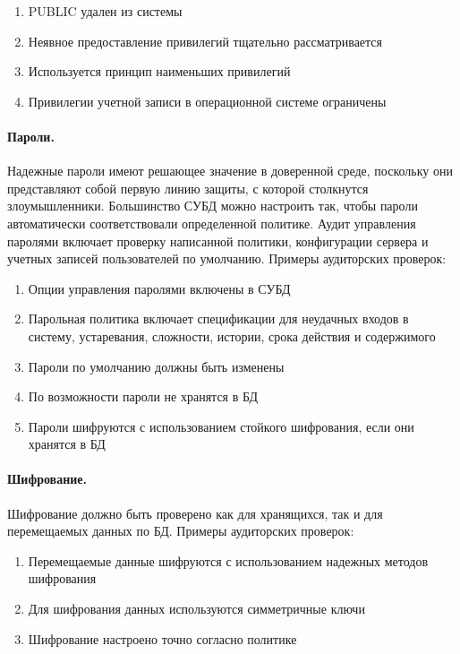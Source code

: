 \begin{enumerate}
	\item PUBLIC удален из системы
	\item Неявное предоставление привилегий тщательно рассматривается
	\item Используется принцип наименьших привилегий
	\item Привилегии учетной записи в операционной системе ограничены
\end{enumerate}

\paragraph{Пароли.}

Надежные пароли имеют решающее значение в доверенной среде, поскольку они представляют собой первую линию защиты, с которой столкнутся злоумышленники. Большинство СУБД можно настроить так, чтобы пароли автоматически соответствовали определенной политике. Аудит управления паролями включает проверку написанной политики, конфигурации сервера и учетных записей пользователей по умолчанию. Примеры аудиторских проверок:

\begin{enumerate}
	\item Опции управления паролями включены в СУБД
	\item Парольная политика включает спецификации для неудачных входов в систему, устаревания, сложности, истории, срока действия и содержимого
	\item Пароли по умолчанию должны быть изменены
	\item По возможности пароли не хранятся в БД
	\item Пароли шифруются с использованием стойкого шифрования, если они хранятся в БД
\end{enumerate}

\paragraph{Шифрование.}

Шифрование должно быть проверено как для хранящихся, так и для перемещаемых данных по БД. Примеры аудиторских проверок:

\begin{enumerate}
	\item Перемещаемые данные шифруются с использованием надежных методов шифрования
	\item Для шифрования данных используются симметричные ключи
	\item Шифрование настроено точно согласно политике
\end{enumerate}

